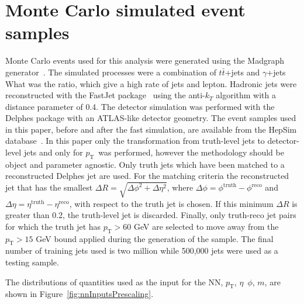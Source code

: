 \documentclass[showpacs,showkeys,preprint,prd,nofootinbib,linenumbers,12pt]{revtex4-1}
\def\pt{\ensuremath{p_{\mathrm{T}}}}
\begin{document}
\section{Monte Carlo simulated event samples}

Monte Carlo events used for this analysis were generated using the Madgraph generator~\cite{madgraph}. The simulated processes were a combination of $t\bar{t}$+jets and $\gamma$+jets {\color{red} What was the ratio}, which give a high rate of jets and lepton. 
Hadronic jets were reconstructed with the {\sc FastJet} package~\cite{fastjet} using the anti-$k_T$ algorithm \cite{Cacciari:2008gp} with a distance parameter of 0.4. The detector simulation was performed with the Delphes package \cite{deFavereau:2013fsa} with an ATLAS-like detector geometry. 
The event samples used in this paper, before and after the fast simulation, are available from the HepSim database~\cite{Chekanov:2014fga}. In this paper only the transformation from truth-level jets to detector-level jets and only for \pt\ was performed, however the methodology should be object and parameter agnostic. Only truth jets which have been matched to a reconstructed Delphes jet are used. For the matching criteria the reconstructed jet that has the smallest $\Delta R=\sqrt{\Delta\phi^2+\Delta\eta^2}$, where $\Delta\phi=\phi^{\text{truth}}-\phi^{\text{reco}}$ and $\Delta\eta=\eta^{\text{truth}}-\eta^{\text{reco}}$, with respect to the truth jet is chosen. If this minimum $\Delta R$ is greater than 0.2, the truth-level jet is discarded. Finally, only truth-reco jet pairs for which the truth jet has $\pt>60$ GeV are selected to move away from the $\pt>15$ GeV bound applied during the generation of the sample. The final number of training jets used is two million while 500,000 jets were used as a testing sample.  

The distributions of quantities used as the input for the NN, \pt, $\eta$\, $\phi$, $m$, are shown in Figure~\ref{fig:nnInputsPrescaling}.
\end{document}
